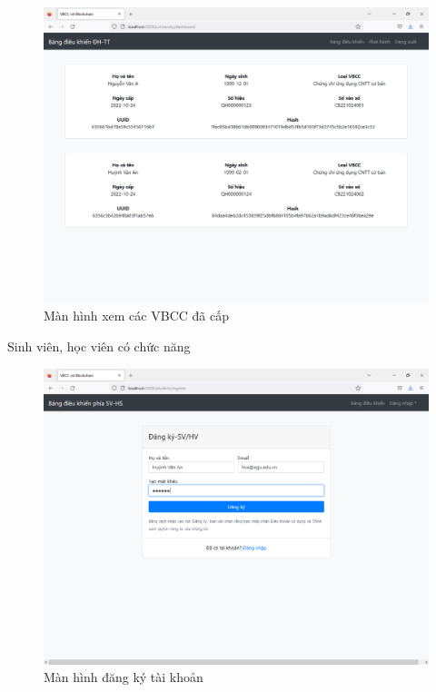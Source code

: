 \begin{figure}[H]
\centering
\includegraphics[width=.9\linewidth]{img/tt_dacap.PNG}
\caption{Màn hình xem các VBCC đã cấp}
\label{fig:tt_dacap}
\end{figure}


Sinh viên, học viên có chức năng

\begin{figure}[H]
\centering
\includegraphics[width=.9\linewidth]{img/std_new.PNG}
\caption{Màn hình đăng ký tài khoản}
\label{fig:std_new}
\end{figure}



